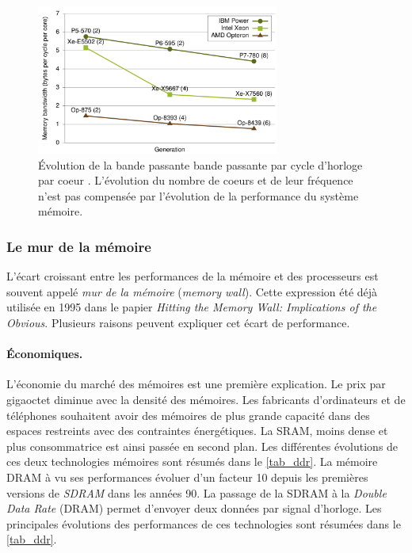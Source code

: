 \begin{figure}
    \center
    \includegraphics[width=8cm]{images/cpu_bw_per_core.png}
    \caption{Évolution de la bande passante bande passante par cycle d'horloge par coeur  \cite{CacheInjection}. L'évolution du nombre de coeurs et de leur fréquence n'est pas compensée par l'évolution de la performance du système mémoire.
    \label{pic_cpu_bw_per_core}}
\end{figure}



\subsubsection{Le mur de la mémoire}
L'écart croissant entre les performances de la mémoire et des processeurs est souvent appelé \textit{mur de la mémoire} (\textit{memory wall}). Cette expression été déjà utilisée en 1995 \cite{Wulf1995} dans le papier \textit{Hitting the Memory Wall: Implications of the Obvious}. Plusieurs raisons peuvent expliquer cet écart de performance.


\paragraph{Économiques.}
L'économie du marché des mémoires est une première explication. Le prix par gigaoctet diminue avec la densité des mémoires. Les fabricants d'ordinateurs et de téléphones souhaitent avoir des mémoires de plus grande capacité dans des espaces restreints avec des contraintes énergétiques. La SRAM, moins dense et plus consommatrice est ainsi passée en second plan. Les différentes évolutions de ces deux technologies mémoires sont résumés dans le \autoref{tab_ddr}.  La mémoire DRAM à vu ses performances évoluer d'un facteur 10 depuis les premières versions de \textit{SDRAM} dans les années 90. La passage de la SDRAM à la \textit{Double Data Rate} (DRAM) permet d'envoyer deux données par signal d'horloge. Les principales évolutions des performances de ces technologies sont résumées dans le \autoref{tab_ddr}. 

